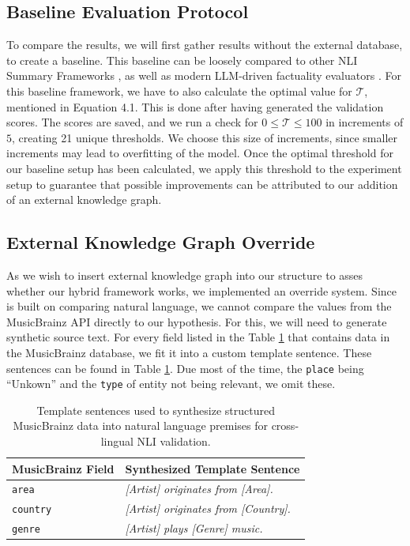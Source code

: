 \subsection{Baseline Evaluation Protocol}
To compare the results, we will first gather results without the external database, to create a baseline. This baseline can be loosely compared to other NLI Summary Frameworks \cite{laban2021summaC}, as well as modern LLM-driven factuality evaluators \cite{chen2023felm}. For this baseline framework, we have to also calculate the optimal value for $\mathcal{T}$, mentioned in Equation 4.1. This is done after having generated the validation scores. The scores are saved, and we run a check for $ 0 \le \mathcal{T} \le 100$ in increments of $5$, creating 21 unique thresholds. We choose this size of increments, since smaller increments may lead to overfitting of the model. Once the optimal threshold for our baseline setup has been calculated, we apply this threshold to the experiment setup to guarantee that possible improvements can be attributed to our addition of an external knowledge graph. 

\subsection{External Knowledge Graph Override}
As we wish to insert external knowledge graph into our structure to asses whether our hybrid framework works, we implemented an override system. Since \rob is built on comparing natural language, we cannot compare the values from the MusicBrainz API directly to our hypothesis. For this, we will need to generate synthetic source text. For every field listed in the Table \ref{tab:mb_synthesis_templates} that contains data in the MusicBrainz database, we fit it into a custom template sentence. These sentences can be found in Table \ref{tab:mb_synthesis_templates}. Due most of the time, the \texttt{place} being ``Unkown'' and the \texttt{type} of entity not being relevant, we omit these. 

\begin{table}[ht]
\centering
\renewcommand{\arraystretch}{1.2}
\begin{tabular}{p{} p{}}
\hline
\textbf{MusicBrainz Field} & \textbf{Synthesized Template Sentence} \\
\hline
\texttt{area}    & \textit{[Artist] originates from [Area].} \\
\texttt{country} & \textit{[Artist] originates from [Country].} \\
\texttt{genre}   & \textit{[Artist] plays [Genre] music.} \\
\hline
\end{tabular}
\caption{Template sentences used to synthesize structured MusicBrainz data into natural language premises for cross-lingual NLI validation.}
\label{tab:mb_synthesis_templates}
\end{table}

